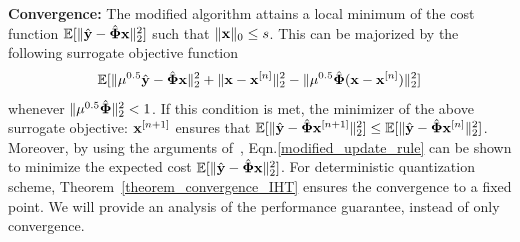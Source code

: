 \documentclass{article}
\begin{document}




{\bf Convergence:} The modified algorithm attains a local minimum of the cost function $\mathbb{E} [ \| \hat{\bf y} - \hat{\bf \Phi}{\bf x}\|_2^2]$ such that $\|{\bf x}\|_0 \leq s$. This can be majorized by the following surrogate objective function 
\begin{equation*}
    \begin{split}
        \mathbb{E} [\|\mu^{0.5}\hat{\bf y} -   \hat{\bf \Phi}{\bf x}\|_2^2+ \|{\bf x} 
    - {\bf x}^{[n]} \|_2^2
    - \|\mu^{0.5}\hat{\bf \Phi}({\bf x}- {\bf x}^{[n]}) \|_2^2] 
    \end{split}
\end{equation*}
whenever $\| \mu^{0.5}\hat{\bf \Phi}\|_2^2 <1$. If this condition is met, the minimizer of the above surrogate objective: ${\bf x}^{[n+1]}$ ensures that $\mathbb{E} [\| \hat{\bf y} - \hat{\bf \Phi}{\bf x}^{[n+1]}\|_2^2] \leq \mathbb{E}[ \| \hat{\bf y} - \hat{\bf \Phi}{\bf x}^{[n]}\|_2^2]$. Moreover, by using the arguments of~\cite{blumensath2008iht}, Eqn.\ref{modified_update_rule} can be shown to minimize the expected cost $\mathbb{E} [ \| \hat{\bf y} - \hat{\bf \Phi}{\bf x}\|_2^2]$. For deterministic quantization scheme, Theorem~\ref{theorem_convergence_IHT} ensures the convergence to a fixed point. {We
will provide an analysis of the performance guarantee,
instead of only convergence.}
\end{document}
